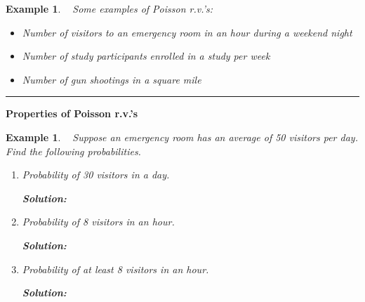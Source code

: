 \documentclass[12pt]{amsart}
\newtheorem{example}[theorem]{Example}
\begin{document}
{%
\begin{example}\ %
Some examples of Poisson r.v.'s:
\begin{itemize}
\item Number of visitors to an emergency room in an hour during a weekend night
\item Number of study participants enrolled in a study per week
\item Number of gun shootings in a square mile
\end{itemize}

\end{example}
\vspace{.5cm}
\hrule
\vspace{.5cm}


\textbf{Properties of Poisson r.v.'s}


\newpage


\begin{example}\ %
Suppose an emergency room has an average of 50 visitors per day. Find the following probabilities.

\begin{enumerate}
\item Probability of 30 visitors in a day.

\textbf{Solution:}
\vspace{4cm}

\item Probability of 8 visitors in an hour.

\textbf{Solution:}
\vspace{5cm}

\item Probability of at least 8 visitors in an hour.

\textbf{Solution:}
\vspace{4.5cm}

\end{enumerate}


\end{example}



}
\end{document}
